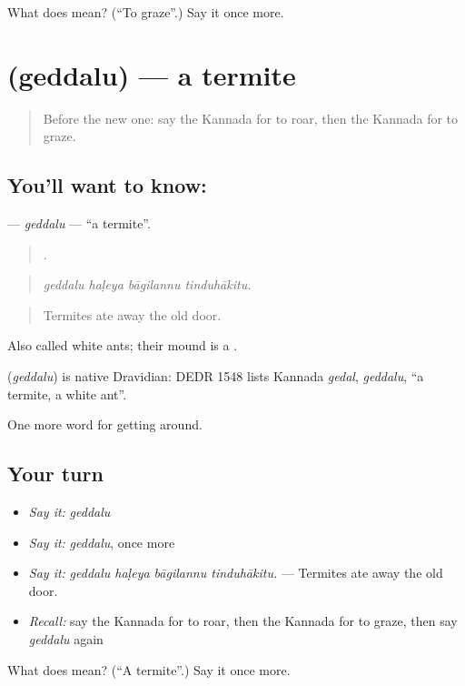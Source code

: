 \begin{tcolorbox}[breakable,colback=teal!4,colframe=teal!35!black,title={Before you move on}]
What does  mean? (\textquotedblleft{}To graze\textquotedblright{}.) Say it once more.
\end{tcolorbox}
\section[\texorpdfstring{\kn{ಗೆದ್ದಲು} (geddalu)}{ಗೆದ್ದಲು (geddalu)}]{ (geddalu) — a termite}

\label{lesson:KA-C477-geddalu}



\begin{quote}
Before the new one: say the Kannada for to roar, then the Kannada for to graze.
\end{quote}

\subsection*{You'll want to know: }
\textbf{} — \emph{geddalu} — \textquotedblleft{}a termite\textquotedblright{}.

\begin{quote}
   .
\end{quote}

\begin{quote}
\emph{geddalu haḷeya bāgilannu tinduhākitu.}
\end{quote}

\begin{quote}
Termites ate away the old door.
\end{quote}

Also called white ants; their mound is a .

\begin{cousinweb}
\textbf{} (\emph{geddalu}) is native Dravidian: DEDR 1548 lists Kannada \emph{gedal}, \emph{geddalu}, \textquotedblleft{}a termite, a white ant\textquotedblright{}.
\end{cousinweb}

\begin{grammarlens}[title={What you've built}]
One more word for getting around.
\end{grammarlens}

\subsection*{Your turn}
\begin{itemize}
\raggedright
  \item \emph{Say it:} \emph{geddalu}
  \item \emph{Say it:} \emph{geddalu}, once more
  \item \emph{Say it:} \emph{geddalu haḷeya bāgilannu tinduhākitu.} — Termites ate away the old door.
  \item \emph{Recall:} say the Kannada for to roar, then the Kannada for to graze, then say \emph{geddalu} again
\end{itemize}

\begin{tcolorbox}[breakable,colback=teal!4,colframe=teal!35!black,title={Before you move on}]
What does  mean? (\textquotedblleft{}A termite\textquotedblright{}.) Say it once more.
\end{tcolorbox}
